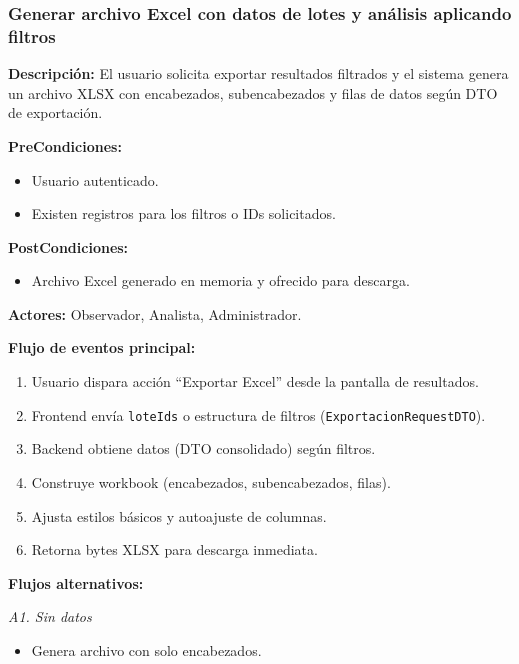 \subsubsection{Generar archivo Excel con datos de lotes y análisis aplicando filtros}

\textbf{Descripción:} El usuario solicita exportar resultados filtrados y el sistema genera un archivo XLSX con encabezados, subencabezados y filas de datos según DTO de exportación.

\vspace{0.5em}
\noindent\textbf{PreCondiciones:}
\begin{itemize}[nosep]
    \item Usuario autenticado.
    \item Existen registros para los filtros o IDs solicitados.
\end{itemize}

\vspace{0.5em}
\noindent\textbf{PostCondiciones:}
\begin{itemize}[nosep]
    \item Archivo Excel generado en memoria y ofrecido para descarga.
\end{itemize}

\vspace{0.5em}
\noindent\textbf{Actores:} Observador, Analista, Administrador.

\vspace{0.5em}
\noindent\textbf{Flujo de eventos principal:}
\begin{enumerate}[nosep]
    \item Usuario dispara acción ``Exportar Excel'' desde la pantalla de resultados.
    \item Frontend envía \texttt{loteIds} o estructura de filtros (\texttt{ExportacionRequestDTO}).
    \item Backend obtiene datos (DTO consolidado) según filtros.
    \item Construye workbook (encabezados, subencabezados, filas).
    \item Ajusta estilos básicos y autoajuste de columnas.
    \item Retorna bytes XLSX para descarga inmediata.
\end{enumerate}

\vspace{0.5em}
\noindent\textbf{Flujos alternativos:}

\vspace{0.3em}
\noindent\textit{A1. Sin datos}
\begin{itemize}[nosep]
    \item Genera archivo con solo encabezados.
\end{itemize}

